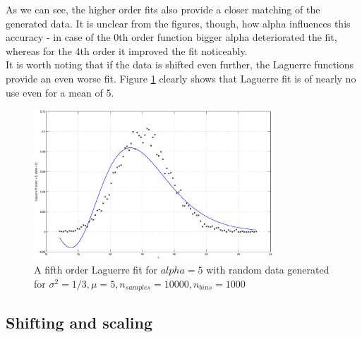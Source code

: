 \documentclass[a4paper]{article}
\numberwithin{equation}{section}
\begin{document}
\noindent As we can see, the higher order fits also provide a closer matching of the generated data. It is unclear from the figures, though, how alpha influences this accuracy - in case of the 0th order function bigger alpha deteriorated the fit, whereas for the 4th order it improved the fit noticeably. \\

\noindent It is worth noting that if the data is shifted even further, the Laguerre functions provide an even worse fit. Figure \ref{fig:poorfit} clearly shows that Laguerre fit is of nearly no use even for a mean of 5.

\begin{figure}[!h]
\centering
\includegraphics[width=0.8\textwidth]{poor_fit.eps}
\caption{\label{fig:poorfit}A fifth order Laguerre fit for $alpha=5$ with random data generated for $\sigma^2=1/3, \mu=5, n_{samples} = 10000, n_{bins} = 1000$}
\end{figure}

\subsection{Shifting and scaling}
\end{document}
